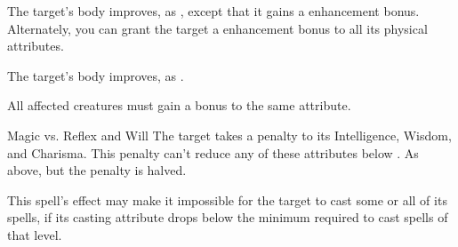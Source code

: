 \begin{spellheader}
    \spellrng{\rngtouch}
    \spelldur{\durshort}
\end{spellheader}
\begin{spelleffects}
    \spelleffect The target's body improves, as , except that it gains a  enhancement bonus. Alternately, you can grant the target a  enhancement bonus to all its physical attributes.
\end{spelleffects}
\begin{spellfooter}

\end{spellfooter}

\begin{spellheader}
\end{spellheader}
\begin{spelleffects}
    \spelleffect The target's body improves, as . 
\end{spelleffects}
\begin{spellfooter}
    \spellnotes All affected creatures must gain a bonus to the same attribute.
\end{spellfooter}

\begin{spellheader}
    \spelldur{\durshort}
\end{spellheader}
\begin{spelleffects}
    \begin{spellattack}{Magic vs. Reflex and Will}
        \spellsuccess[Reflex] The target takes a  penalty to its Intelligence, Wisdom, and Charisma. This penalty can't reduce any of these attributes below .
        \spellfailure[Will] As above, but the penalty is halved.
    \end{spellattack}
\end{spelleffects}
\begin{spellfooter}
    \spellnotes This spell's effect may make it impossible for the target to cast some or all of its spells, if its casting attribute drops below the minimum required to cast spells of that level.
\end{spellfooter}

